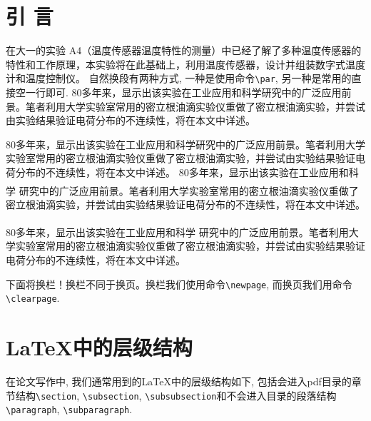 \documentclass[10pt,a4paper,twocolumn,twoside,UTF8]{ctexart}
\newcommand{\upcite}[1]{\textsuperscript{\textsuperscript{\cite{#1}}}} %
\begin{document}
\section{引 \quad 言}
在大一的实验 A4（温度传感器温度特性的测量）中已经了解了多种温度传感器的特性和工作原理，本实验将在此基础上，利用温度传感器，设计并组装数字式温度计和温度控制仪。
自然换段有两种方式, 一种是使用命令\lstinline|\par|, 另一种是常用的直接空一行即可.
80多年来，显示出该实验在工业应用和科学研究中的广泛应用前景。笔者利用大学实验室常用的密立根油滴实验仪重做了密立根油滴实验，并尝试由实验结果验证电荷分布的不连续性，将在本文中详述。\par
80多年来，显示出该实验在工业应用和科学研究中的广泛应用前景。笔者利用大学实验室常用的密立根油滴实验仪重做了密立根油滴实验，并尝试由实验结果验证电荷分布的不连续性，将在本文中详述。
80多年来，显示出该实验在工业应用和科学 \upcite{test01}研究中的广泛应用前景。笔者利用大学实验室常用的密立根油滴实验仪重做了密立根油滴实验，并尝试由实验结果验证电荷分布的不连续性，将在本文中详述。

80多年来，显示出该实验在工业应用和科学 \upcite{test02}研究中的广泛应用前景。笔者利用大学实验室常用的密立根油滴实验仪重做了密立根油滴实验，并尝试由实验结果验证电荷分布的不连续性，将在本文中详述。

下面将换栏！换栏不同于换页。换栏我们使用命令\lstinline|\newpage|, 而换页我们用命令\lstinline|\clearpage|.
\newpage

\section{\LaTeX 中的层级结构}
在论文写作中, 我们通常用到的\LaTeX 中的层级结构如下, 包括会进入pdf目录的章节结构\lstinline|\section|, \lstinline|\subsection|, \lstinline|\subsubsection|和不会进入目录的段落结构\lstinline|\paragraph|, \lstinline|\subparagraph|.
\end{document}
